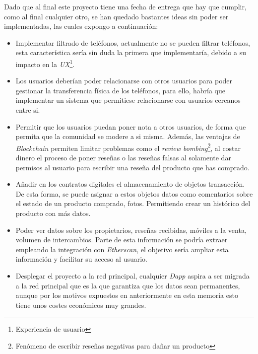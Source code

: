 Dado que al final este proyecto tiene una fecha de entrega que hay que cumplir, como al final cualquier otro, se han quedado bastantes ideas sin poder ser implementadas, las cuales expongo a continuación:
\begin{itemize}
    \item Implementar filtrado de teléfonos, actualmente no se pueden filtrar teléfonos, esta característica sería sin duda la primera que implementaría, debido a su impacto en la \textit{UX}\footnote{Experiencia de usuario}.
    \item Los usuarios deberían poder relacionarse con otros usuarios para poder gestionar la transferencia física de los teléfonos, para ello, habría que implementar un sistema que permitiese relacionarse con usuarios cercanos entre si.
    \item Permitir que los usuarios puedan poner nota a otros usuarios, de forma que permita que la comunidad se modere a si misma. Además, las ventajas de \textit{Blockchain} permiten limitar problemas como el \textit{review bombing}\footnote{Fenómeno de escribir reseñas negativas para dañar un producto}, al costar dinero el proceso de poner reseñas o las reseñas falsas al solamente dar permisos al usuario para escribir una reseña del producto que has comprado.
    \item Añadir en los contratos digitales el almacenamiento de objetos transacción. De esta forma, se puede asignar a estos objetos datos como comentarios sobre el estado de un producto comprado, fotos. Permitiendo crear un histórico del producto con más datos.
    \item Poder ver datos sobre los propietarios, reseñas recibidas, móviles a la venta, volumen de intercambios. Parte de esta información se podría extraer empleando la integración con \textit{Etherscan}, el objetivo sería ampliar esta información y facilitar su acceso al usuario.
    \item Desplegar el proyecto a la red principal, cualquier \textit{Dapp} aspira a ser migrada a la red principal que es la que garantiza que los datos sean permanentes, aunque por los motivos expuestos en 
    anteriormente en esta memoria esto tiene unos costes económicos muy grandes.
\end{itemize}